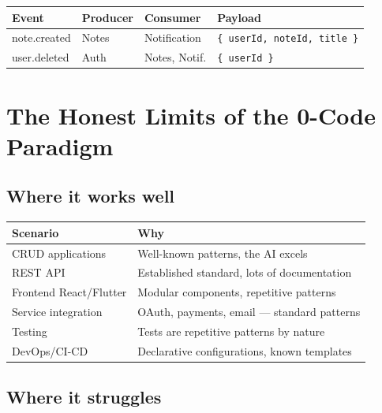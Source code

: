 \begin{center}
\begin{tabularx}{\textwidth}{l l l X}
\toprule
\textbf{Event} & \textbf{Producer} & \textbf{Consumer} & \textbf{Payload} \\
\midrule
note.created & Notes & Notification & \texttt{\{ userId, noteId, title \}} \\
user.deleted & Auth & Notes, Notif. & \texttt{\{ userId \}} \\
\bottomrule
\end{tabularx}
\end{center}

\section{The Honest Limits of the 0-Code Paradigm}

\subsection{Where it works well}

\begin{center}
\begin{tabularx}{\textwidth}{l X}
\toprule
\textbf{Scenario} & \textbf{Why} \\
\midrule
CRUD applications & Well-known patterns, the AI excels \\
REST API & Established standard, lots of documentation \\
Frontend React/Flutter & Modular components, repetitive patterns \\
Service integration & OAuth, payments, email --- standard patterns \\
Testing & Tests are repetitive patterns by nature \\
DevOps/CI-CD & Declarative configurations, known templates \\
\bottomrule
\end{tabularx}
\end{center}

\subsection{Where it struggles}

